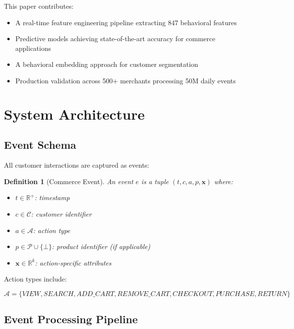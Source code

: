 \documentclass[11pt,a4paper]{article}
\newtheorem{definition}[theorem]{Definition}
\begin{document}
This paper contributes:

\begin{itemize}
    \item A real-time feature engineering pipeline extracting 847 behavioral features
    \item Predictive models achieving state-of-the-art accuracy for commerce applications
    \item A behavioral embedding approach for customer segmentation
    \item Production validation across 500+ merchants processing 50M daily events
\end{itemize}

\section{System Architecture}

\subsection{Event Schema}

All customer interactions are captured as events:

\begin{definition}[Commerce Event]
An event $e$ is a tuple $(t, c, a, p, \mathbf{x})$ where:
\begin{itemize}
    \item $t \in \mathbb{R}^+$: timestamp
    \item $c \in \mathcal{C}$: customer identifier
    \item $a \in \mathcal{A}$: action type
    \item $p \in \mathcal{P} \cup \{\bot\}$: product identifier (if applicable)
    \item $\mathbf{x} \in \mathbb{R}^k$: action-specific attributes
\end{itemize}
\end{definition}

Action types include:

\[
\mathcal{A} = \{VIEW, SEARCH, ADD\_CART, REMOVE\_CART, CHECKOUT, PURCHASE, RETURN\}
\]

\subsection{Event Processing Pipeline}
\end{document}
